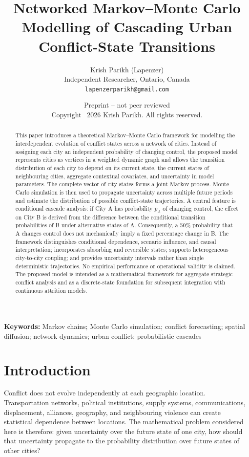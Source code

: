 \documentclass[11pt,letterpaper]{article}
\title{\textbf{Networked Markov--Monte Carlo Modelling of Cascading Urban Conflict-State Transitions}}
\author{Krish Parikh (Lapenzer)\\Independent Researcher, Ontario, Canada\\\texttt{lapenzerparikh@gmail.com}}
\date{Preprint -- not peer reviewed\\Copyright \textcopyright\ 2026 Krish Parikh. All rights reserved.}
\begin{document}
\maketitle

\begin{abstract}
This paper introduces a theoretical Markov--Monte Carlo framework for modelling the interdependent evolution of conflict states across a network of cities. Instead of assigning each city an independent probability of changing control, the proposed model represents cities as vertices in a weighted dynamic graph and allows the transition distribution of each city to depend on its current state, the current states of neighbouring cities, aggregate contextual covariates, and uncertainty in model parameters. The complete vector of city states forms a joint Markov process. Monte Carlo simulation is then used to propagate uncertainty across multiple future periods and estimate the distribution of possible conflict-state trajectories. A central feature is conditional cascade analysis: if City A has probability $p_A$ of changing control, the effect on City B is derived from the difference between the conditional transition probabilities of B under alternative states of A. Consequently, a 50\% probability that A changes control does not mechanically imply a fixed percentage change in B. The framework distinguishes conditional dependence, scenario influence, and causal interpretation; incorporates absorbing and reversible states; supports heterogeneous city-to-city coupling; and provides uncertainty intervals rather than single deterministic trajectories. No empirical performance or operational validity is claimed. The proposed model is intended as a mathematical framework for aggregate strategic conflict analysis and as a discrete-state foundation for subsequent integration with continuous attrition models.
\end{abstract}

\noindent\textbf{Keywords:} Markov chains; Monte Carlo simulation; conflict forecasting; spatial diffusion; network dynamics; urban conflict; probabilistic cascades

\section{Introduction}
Conflict does not evolve independently at each geographic location. Transportation networks, political institutions, supply systems, communications, displacement, alliances, geography, and neighbouring violence can create statistical dependence between locations. The mathematical problem considered here is therefore: given uncertainty over the future state of one city, how should that uncertainty propagate to the probability distribution over future states of other cities?
\end{document}
